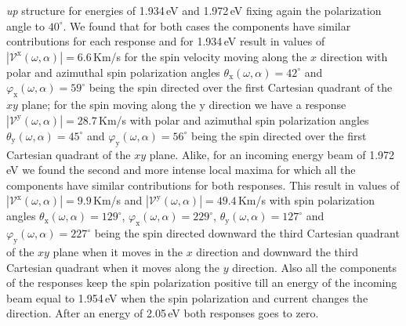 \documentclass[prb,11pt,tightenlines,twocolumn,aps]{revtex4-1}
\begin{document}
\emph{up} structure for energies of 1.934\,eV and 1.972\,eV
fixing again the polarization angle to $40^{\circ}$.
{\color{red} We found that for both cases the components have similar
contributions for each response and for 1.934\,eV result in values of
$|\mathcal{V}^{\mathrm{x}}(\omega,\alpha)| = 6.6$\,Km/s for the spin velocity
moving along the $x$ direction with polar and azimuthal spin polarization
angles $\theta_{\mathrm{x}}(\omega,\alpha)= 42^{\circ}$ and
$\varphi_{\mathrm{x}}(\omega,\alpha)=59^{\circ}$ being the spin directed over
the first Cartesian quadrant of the $xy$ plane;
% 
for the spin moving along the $\mathrm{y}$ direction we have a response
$|\mathcal{V}^{\mathrm{y}}(\omega,\alpha)|=28.7$\,Km/s with polar and azimuthal
spin polarization angles $\theta_{\mathrm{y}}(\omega,\alpha)=45^{\circ}$ and
$\varphi_{\mathrm{y}}(\omega,\alpha)=56^{\circ}$ being  the spin directed over
the first Cartesian quadrant of the $xy$ plane.
% 
Alike, for an incoming energy beam of 1.972\,eV we found the second and more
intense local maxima for which all the components have similar contributions
for both responses.
% 
This result in values of $|\mathcal{V}^{\mathrm{x}}(\omega,\alpha)| =
9.9$\,Km/s and $|\mathcal{V}^{\mathrm{y}}(\omega,\alpha)| = 49.4$\,Km/s with
spin polarization angles $\theta_{\mathrm{x}}(\omega,\alpha) = 129^{\circ}$,
$\varphi_{\mathrm{x}}(\omega,\alpha)=229^{\circ}$,
$\theta_{\mathrm{y}}(\omega,\alpha) = 127^{\circ}$ and
$\varphi_{\mathrm{y}}(\omega,\alpha)=227^{\circ}$ being the spin directed
downward the third Cartesian quadrant of the $xy$ plane when it moves in the
$x$ direction and downward the third Cartesian quadrant when it moves along the
$y$ direction.}
% 
Also all the components of the responses keep the spin polarization positive
till an energy of the incoming beam equal to 1.954\,eV when the spin
polarization and current changes the direction. After an energy of 2.05\,eV
both responses goes to zero.

\end{document}
